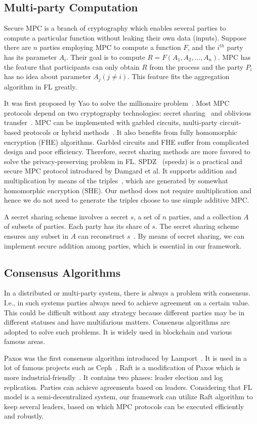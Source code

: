 \subsection{Multi-party Computation}
Secure MPC is a branch of cryptography which enables several parties to compute a particular function without leaking their own data (inputs). Suppose there are $n$ parties employing MPC to compute a function $F$, and the $i^{th}$ party has its parameter $A_i$. Their goal is to compute $R = F(A_1, A_2, ..., A_n)$. MPC has the feature that participants can only obtain $R$ from the process and the party $P_i$ has no idea about parameter $A_j (j \ne i)$. This feature fits the aggregation algorithm in FL greatly.

It was first proposed by Yao to solve the millionaire problem~\cite{Yao}. Most MPC protocols depend on two cryptography technologies: secret sharing~\cite{Shamir} and oblivious transfer~\cite{OT}. MPC can be implemented with garbled circuits, multi-party circuit-based protocols or hybrid methods~\cite{mpc-sok}. It also benefits from fully homomorphic encryption (FHE) algorithms. Garbled circuits and FHE suffer from complicated design and poor efficiency. Therefore, secret sharing methods are more favored to solve the privacy-preserving problem in FL. SPDZ~\cite{SPDZ} (speedz) is a practical and secure MPC protocol introduced by Damgard et al. It supports addition and multiplication by means of the triples~\cite{Triple}, which are generated by somewhat homomorphic encryption (SHE). Our method does not require multiplication and hence we do not need to generate the triples choose to use simple additive MPC.

A secret sharing scheme involves a secret $s$, a set of $n$ parties, and a collection $A$ of subsets of parties. Each party has its share of $s$. The secret sharing scheme ensures any subset in $A$ can reconstruct $s$~\cite{Secret-Sharing-survey}. By means of secret sharing, we can implement secure addition among parties, which is essential in our framework.


\subsection{Consensus Algorithms}
In a distributed or multi-party system, there is always a problem with consensus. I.e., in such systems parties always need to achieve agreement on a certain value. This could be difficult without any strategy because different parties may be in different statuses and have multifarious matters. Consensus algorithms are adopted to solve such problems. It is widely used in blockchain and various famous areas.

Paxos was the first consensus algorithm introduced by Lamport~\cite{Paxos}. It is used in a lot of famous projects such as Ceph~\cite{Ceph}. Raft is a modification of Paxos which is more industrial-friendly~\cite{Raft}. It contains two phases: leader election and log replication. Parties can achieve agreements based on leaders. Considering that FL model is a semi-decentralized system, our framework can utilize Raft algorithm to keep several leaders, based on which MPC protocols can be executed efficiently and robustly.
